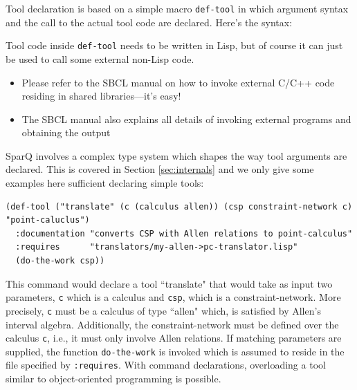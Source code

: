 \documentclass[headsepline]{scrreprt}
\theoremstyle{definition}
\newcommand{\engine}{SparQ}
\begin{document}
\begin{nopagebreak}
Tool declaration is based on a simple macro {\tt def-tool} in which argument syntax and the call to the actual tool code are  declared. Here's the syntax:\\ \noindent
\medskip
\centerline{}
\medskip
\end{nopagebreak}

Tool code inside {\tt def-tool} needs to be written in Lisp, but of course it can just be used to call some external non-Lisp code.

\begin{itemize}
	\item Please refer to the SBCL manual on how to invoke external C/C++ code residing in shared libraries---it's easy!
	\item The SBCL manual also explains all details of invoking external programs and obtaining the output
\end{itemize}

\engine{} involves a complex type system which shapes the way tool arguments are declared. This is covered in Section \ref{sec:internals} and we only give some examples here sufficient declaring simple tools:

\begin{lstlisting}
(def-tool ("translate" (c (calculus allen)) (csp constraint-network c) "point-caluclus")
  :documentation "converts CSP with Allen relations to point-calculus"
  :requires      "translators/my-allen->pc-translator.lisp"
  (do-the-work csp))
\end{lstlisting}
This command would declare a tool ``translate" that would take as input two parameters, {\tt c} which is a calculus and {\tt csp}, which is a constraint-network. More precisely, {\tt c} must be a calculus of type ``allen" which, is satisfied by Allen's interval algebra. Additionally, the constraint-network must be defined over the calculus {\tt c}, i.e., it must only involve Allen relations. If matching parameters are supplied, the function {\tt do-the-work} is invoked which is assumed to reside in the file specified by {\tt :requires}.
With command declarations, overloading a tool similar to object-oriented programming is possible.
\end{document}
